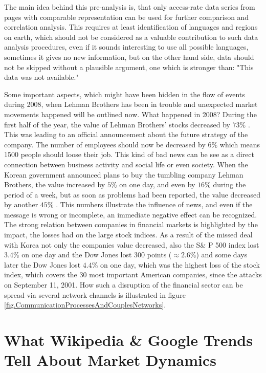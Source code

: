 \documentclass[a4paper,10pt]{scrbook}
\begin{document}
The main idea behind this pre-analysis is, that only access-rate data series from pages with comparable representation can be used for further comparison and correlation analysis. This requires at least identification of languages and regions on earth, which should not be considered as a valuable contribution to such data analysis procedures, even if it sounds interesting to use all possible languages, sometimes it gives no new information, but on the other hand side, data should not be skipped without a plausible argument, one which is stronger than: "This data was not available."

Some important aspects, which might have been hidden in the flow of events during 2008, when Lehman Brothers has been in trouble and unexpected market movements happened will be outlined now. What happened in 2008? During the first half of the year, the value of Lehman Brothers' stocks decreased by $73\%$ \cite{wiki.lehman.6}. This was leading to an official announcement about the future strategy of the company. The number of employees should now be decreased by $6\%$ which means 1500 people should loose their job. This kind of bad news can be see as a direct connection between business activity and social life or even society. When the Korean government announced plans to buy the tumbling company Lehman Brothers, the value increased by $5\%$ on one day, and even by $16\%$ during the period of a week, but as soon as problems had been reported, the value decreased by another $45\%$ \cite{wiki.lehman.9}. 
This numbers illustrate the influence of news, and even if the message is wrong or incomplete, an immediate negative effect can be recognized. The strong relation between companies in financial markets is highlighted by the impact, the losses had on the large stock indices. As a result of the missed deal with Korea not only the companies value decreased, also the S\& P 500 index lost $3.4\%$ on one day and the Dow Jones lost 300 points ($\approx 2.6\%$) and some days later the Dow Jones lost $4.4\%$ on one day, which was the highest loss of the stock index, which covers the 30 most important American companies, since the attacks on September 11, 2001.
How such a disruption of the financial sector can be spread via several network channels is illustrated in figure  \ref{fig.CommunicationProcessesAndCouplesNetworks}.    


\section{What Wikipedia \& Google Trends Tell About Market Dynamics}
\end{document}
